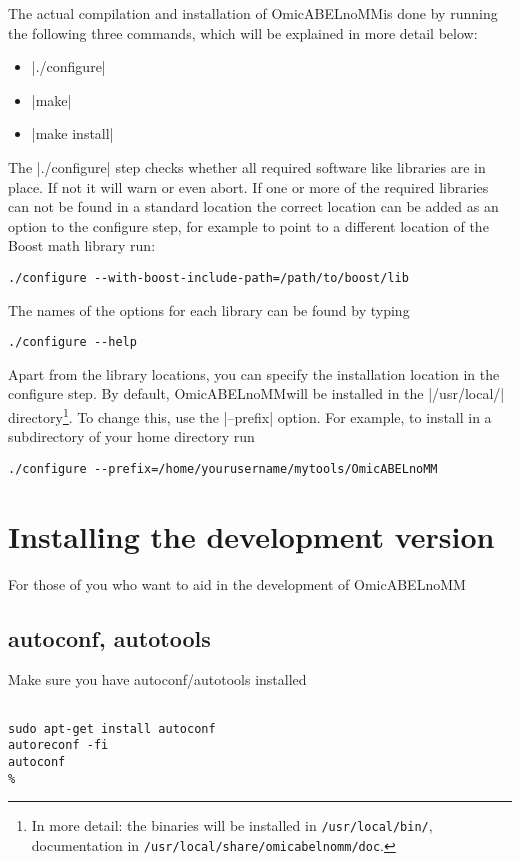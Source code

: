 \documentclass{report}
\newcommand{\oanomm}{OmicABELnoMM}
\begin{document}
The actual compilation and installation of \oanomm is done by running
the following three commands, which will be explained in more detail
below:
\begin{itemize}
\item |./configure|
\item |make|
\item |make install|
\end{itemize}
The |./configure| step checks whether all required software like
libraries are in place. If not it will warn or even abort. If one or
more of the required libraries can not be found in a standard location
the correct location can be added as an option to the configure step,
for example to point to a different location of the Boost math library
run:
\begin{lstlisting}
./configure --with-boost-include-path=/path/to/boost/lib
\end{lstlisting}
The names of the options for each library can be found by typing
\begin{lstlisting}
./configure --help
\end{lstlisting}

Apart from the library locations, you can specify the installation
location in the configure step. By default, \oanomm will be installed
in the |/usr/local/| directory\footnote{In more detail: the binaries
  will be installed in \lstinline{/usr/local/bin/}, documentation in
  \lstinline{/usr/local/share/omicabelnomm/doc}.}. To change this,
use the |--prefix| option. For example, to install in a subdirectory
of your home directory run
\begin{lstlisting}
./configure --prefix=/home/yourusername/mytools/OmicABELnoMM
\end{lstlisting}


\section{Installing the development version}
For those of you who want to aid in the development of \oanomm

\subsection{autoconf, autotools}

Make sure you have autoconf/autotools installed
\begin{lstlisting}[escapechar=\%]

sudo apt-get install autoconf
autoreconf -fi
autoconf
%
\end{lstlisting}
\end{document}
